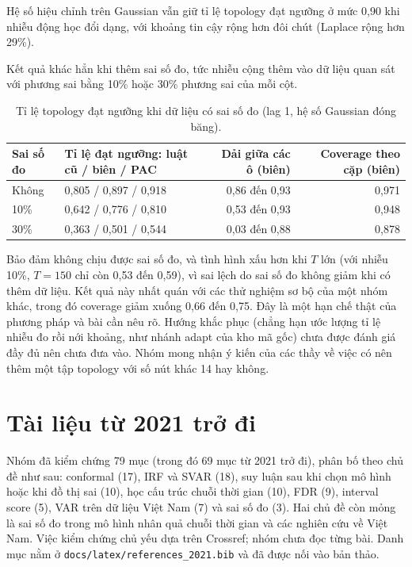\documentclass[11pt,a4paper]{article}
\begin{document}
Hệ số hiệu chỉnh trên Gaussian vẫn giữ tỉ lệ topology đạt ngưỡng ở mức 0,90 khi nhiễu động học đổi dạng, với khoảng tin cậy rộng hơn đôi chút (Laplace rộng hơn 29\%).

Kết quả khác hẳn khi thêm sai số đo, tức nhiễu cộng thêm vào dữ liệu quan sát với phương sai bằng 10\% hoặc 30\% phương sai của mỗi cột.

\begin{table}[H]
\centering
\caption{Tỉ lệ topology đạt ngưỡng khi dữ liệu có sai số đo (lag 1, hệ số Gaussian đóng băng).}\label{tab:me}
{\small
\begin{tabular}{lp{4.2cm}rr}
\toprule
Sai số đo & Tỉ lệ đạt ngưỡng: luật cũ / biên / PAC & Dải giữa các ô (biên) & Coverage theo cặp (biên) \\
\midrule
Không & 0,805 / 0,897 / 0,918 & 0,86 đến 0,93 & 0,971 \\
10\% & 0,642 / 0,776 / 0,810 & 0,53 đến 0,93 & 0,948 \\
30\% & 0,363 / 0,501 / 0,544 & 0,03 đến 0,88 & 0,878 \\
\bottomrule
\end{tabular}
}
\end{table}


Bảo đảm không chịu được sai số đo, và tình hình xấu hơn khi $T$ lớn (với nhiễu 10\%, $T=150$ chỉ còn 0,53 đến 0,59), vì sai lệch do sai số đo không giảm khi có thêm dữ liệu. Kết quả này nhất quán với các thử nghiệm sơ bộ của một nhóm khác, trong đó coverage giảm xuống 0,66 đến 0,75. Đây là một hạn chế thật của phương pháp và bài cần nêu rõ. Hướng khắc phục (chẳng hạn ước lượng tỉ lệ nhiễu đo rồi nới khoảng, như nhánh adapt của kho mã gốc) chưa được đánh giá đầy đủ nên chưa đưa vào. Nhóm mong nhận ý kiến của các thầy về việc có nên thêm một tập topology với số nút khác 14 hay không.

\section{Tài liệu từ 2021 trở đi}

Nhóm đã kiểm chứng 79 mục (trong đó 69 mục từ 2021 trở đi), phân bố theo chủ đề như sau: conformal (17), IRF và SVAR (18), suy luận sau khi chọn mô hình hoặc khi đồ thị sai (10), học cấu trúc chuỗi thời gian (10), FDR (9), interval score (5), VAR trên dữ liệu Việt Nam (7) và sai số đo (3). Hai chủ đề còn mỏng là sai số đo trong mô hình nhân quả chuỗi thời gian và các nghiên cứu về Việt Nam. Việc kiểm chứng chủ yếu dựa trên Crossref; nhóm chưa đọc từng bài. Danh mục nằm ở \texttt{docs/latex/references\_2021.bib} và đã được nối vào bản thảo.
\end{document}
